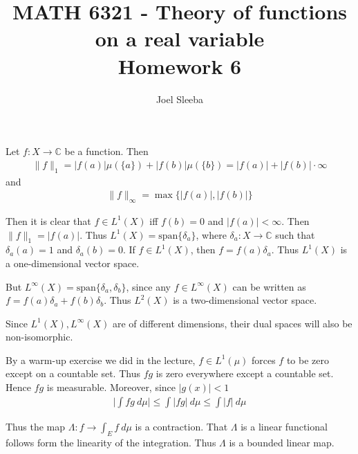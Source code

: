 \documentclass[12pt]{exam}
\theoremstyle{plain} %
\theoremstyle{definition} %
\theoremstyle{remark} %
\begin{document}
\title{MATH 6321 - Theory of functions on a real variable \\ Homework  6}

\author{
  Joel Sleeba \\
}

\maketitle
\printanswers
\unframedsolutions

\begin{questions}

  \question
  \begin{solution}
    Let $f : X \to \mathbb{C}$ be a function. Then
    \begin{align*}
      \|f\|_1 = |f(a)| \mu(\{ a \}) + |f(b)| \mu(\{ b \}) = |f(a)| +
      |f(b)|\cdot \infty
    \end{align*}
    and
    \begin{align*}
      \|f\|_\infty = \max \{ |f(a)|, |f(b)| \}
    \end{align*}
  \end{solution}
  Then it is clear that $f \in L^{1}(X)$ iff $f(b) = 0$ and $|f(a)| <
  \infty$. Then $\|f\|_1 = |f(a)|$. Thus $L^{1}(X) =
  \textrm{span}\{\delta_a\}$, where $\delta_a : X \to \mathbb{C}$
  such that $\delta_a(a) = 1$ and $\delta_a(b) = 0$. If $f \in
  L^{1}(X)$, then $f = f(a)\delta_a$. Thus $L^{1}(X)$ is a
  one-dimensional vector space.

  But $L^{\infty}(X) = \textrm{span}\{ \delta_a, \delta_b \}$, since
  any $f \in L^{\infty}(X)$ can be written as $f = f(a)\delta_a +
  f(b)\delta_b$. Thus $L^{2}(X)$ is a two-dimensional vector space.

  Since $L^1(X), L^\infty(X)$ are of different dimensions, their dual
  spaces will also be non-isomorphic.

  \question

  \begin{solution}
    By a warm-up exercise we did in the lecture, $f \in L^{1}(\mu)$
    forces $f$ to be zero except on a countable set. Thus $fg$ is
    zero everywhere except a countable set. Hence $fg$ is measurable.
    Moreover, since $|g(x)| < 1$
    \begin{align*}
      \Big|\int fg \ d \mu\Big| \le \int |fg| \ d \mu \le \int |f| \ d \mu
    \end{align*}
  \end{solution}
  Thus the map $\Lambda: f \to \int_E  f \ d \mu$ is a contraction.
  That $\Lambda$ is a linear functional follows form the linearity of
  the integration. Thus $\Lambda$ is a bounded linear map.


\end{questions}
\end{document}

